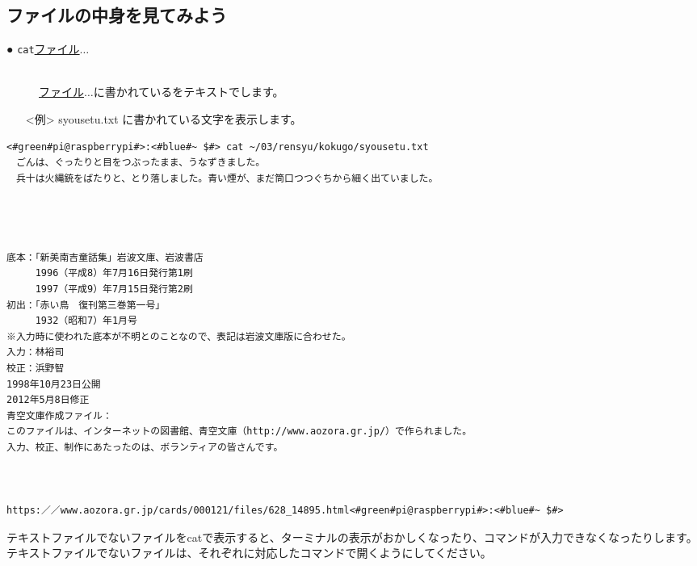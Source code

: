 \documentclass[text03.tex]{subfiles}
\begin{document}
\subsection{ファイルの中身を見てみよう}
\begin{description}
\item[● \texttt{cat}\textvisiblespace \underline{ファイル}$\ldots$ ]\mbox{}\\
\underline{ファイル}$\ldots$に書かれているをテキストでします。
\end{description}
\begin{itemize}
\item[<例>]syousetu.txt に書かれている文字を表示します。
\end{itemize}
\begin{lstlisting}[caption=catの例, label=cat]
<#green#pi@raspberrypi#>:<#blue#~ $#> cat ~/03/rensyu/kokugo/syousetu.txt
　ごんは、ぐったりと目をつぶったまま、うなずきました。
　兵十は火縄銃をばたりと、とり落しました。青い煙が、まだ筒口つつぐちから細く出ていました。




底本：「新美南吉童話集」岩波文庫、岩波書店
　　　1996（平成8）年7月16日発行第1刷
　　　1997（平成9）年7月15日発行第2刷
初出：「赤い鳥　復刊第三巻第一号」
　　　1932（昭和7）年1月号
※入力時に使われた底本が不明とのことなので、表記は岩波文庫版に合わせた。
入力：林裕司
校正：浜野智
1998年10月23日公開
2012年5月8日修正
青空文庫作成ファイル：
このファイルは、インターネットの図書館、青空文庫（http://www.aozora.gr.jp/）で作られました。
入力、校正、制作にあたったのは、ボランティアの皆さんです。



https:／／www.aozora.gr.jp/cards/000121/files/628_14895.html<#green#pi@raspberrypi#>:<#blue#~ $#>
\end{lstlisting}
テキストファイルでないファイルをcatで表示すると、ターミナルの表示がおかしくなったり、コマンドが入力できなくなったりします。テキストファイルでないファイルは、それぞれに対応したコマンドで開くようにしてください。
\end{document}
